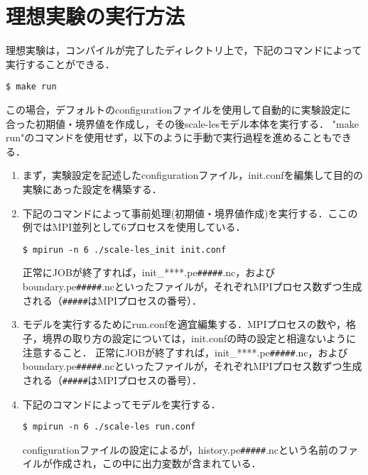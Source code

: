 \chapter{理想実験の実行方法}
理想実験は，コンパイルが完了したディレクトリ上で，下記のコマンドによって
実行することができる．
\begin{verbatim}
$ make run
\end{verbatim}
この場合，デフォルトのconfigurationファイルを使用して自動的に実験設定に
合った初期値・境界値を作成し，その後scale-lesモデル本体を実行する．
"make run"のコマンドを使用せず，以下のように手動で実行過程を進めることもできる．

\begin{enumerate}
\item まず，実験設定を記述したconfigurationファイル，init.confを編集して目的の実験にあった設定を構築する．

\item 下記のコマンドによって事前処理(初期値・境界値作成)を実行する．ここの例ではMPI並列として6プロセスを使用している．
\begin{verbatim}
$ mpirun -n 6 ./scale-les_init init.conf
\end{verbatim}
正常にJOBが終了すれば，init\_****.pe\verb|#####|.nc，およびboundary.pe\verb|#####|.ncといったファイルが，それぞれMPIプロセス数ずつ生成される（\verb|#####|はMPIプロセスの番号）．

\item モデルを実行するためにrun.confを適宜編集する．MPIプロセスの数や，格子，境界の取り方の設定については，init.confの時の設定と相違ないように注意すること．
正常にJOBが終了すれば，init\_****.pe\verb|#####|.nc，およびboundary.pe\verb|#####|.ncといったファイルが，それぞれMPIプロセス数ずつ生成される（\verb|#####|はMPIプロセスの番号）．

\item 下記のコマンドによってモデルを実行する．
\begin{verbatim}
$ mpirun -n 6 ./scale-les run.conf
\end{verbatim}
configurationファイルの設定によるが，history.pe\verb|#####|.ncという名前のファイルが作成され，この中に出力変数が含まれている．
\end{enumerate}

